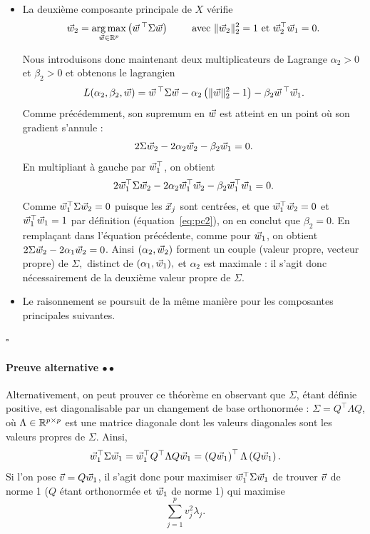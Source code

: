 \begin{itemize}
\item La deuxième composante principale de $X$ vérifie
\begin{equation}
  \label{eq:pc2}
  \ww_2 = \argmax_{\ww \in \RR^p} \left( \ww^\top \Sigma \ww \right) \text{ \qquad avec } \ltwonorm{\ww_2}^2=1
  \text{ et } \ww_2^\top\ww_1=0.
\end{equation}

Nous introduisons donc maintenant deux multiplicateurs de Lagrange
$\alpha_2 > 0$ et $\beta_2 > 0$ et obtenons le lagrangien
\begin{equation*}
  L(\alpha_2, \beta_2, \ww) = \ww^\top \Sigma \ww - \alpha_2 
  \left(\ltwonorm{\ww}^2 - 1 \right)
  - \beta_2 \ww^\top\ww_1.
\end{equation*}
Comme précédemment, son supremum en $\ww$ est atteint en un point où son
gradient s'annule :
\begin{equation*}
  2 \Sigma \ww_2 - 2 \alpha_2 \ww_2 - \beta_2 \ww_1 = 0.
\end{equation*}
En multipliant à gauche par $\ww_1^\top$, on obtient
\begin{equation*}
  2 \ww_1^\top \Sigma \ww_2 - 2 \alpha_2 \ww_1^\top \ww_2 - 
  \beta_2 \ww_1^\top \ww_1 = 0.
\end{equation*}
Comme $\ww_1^\top \Sigma \ww_2 = 0$ puisque les $\xx_j$ sont centrées, et que
$\ww_1^\top \ww_2 = 0$ et $\ww_1^\top \ww_1 = 1$ par définition
(équation~\eqref{eq:pc2}), on en conclut que $\beta_2=0.$ En remplaçant dans
l'équation précédente, comme pour $\ww_1$, on obtient
$2 \Sigma \ww_2 - 2 \alpha_1 \ww_2 = 0$.  Ainsi $(\alpha_2, \ww_2)$ forment un
couple (valeur propre, vecteur propre) de $\Sigma,$ distinct de
$(\alpha_1, \ww_1),$ et $\alpha_2$ est maximale : il s'agit donc nécessairement
de la deuxième valeur propre de $\Sigma$.
    
\item Le raisonnement se poursuit de la même manière pour les composantes principales
  suivantes.
\end{itemize}
\hfill $\square$

  
\paragraph{Preuve alternative  $\bullet\bullet$} Alternativement, on peut prouver ce théorème
en observant que $\Sigma$, étant définie positive, est
diagonalisable par un changement de base orthonormée :
$\Sigma = Q^\top \Lambda Q$, où $\Lambda \in \mathbb{R}^{p \times p}$ est une
matrice diagonale dont les valeurs diagonales sont les valeurs propres de
$\Sigma$.  Ainsi,
\begin{equation*}
  \ww_1^\top \Sigma \ww_1 = \ww_1^\top Q^\top \Lambda Q \ww_1 = 
  \left(Q \ww_1 \right)^\top \Lambda \left(Q \ww_1 \right).
\end{equation*}
Si l'on pose $\vv = Q \ww_1$, il s'agit donc pour maximiser
$\ww_1^\top \Sigma \ww_1$ de trouver $\vv$ de norme 1 ($Q$ étant orthonormée et
$\ww_1$ de norme 1) qui maximise
\[\sum_{j=1}^p v_j^2 \lambda_j.\]  

